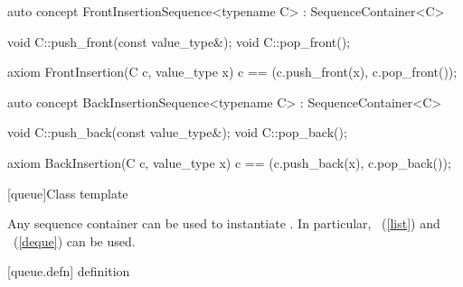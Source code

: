 \documentclass[american,twoside]{book}
\begin{document}
\begin{itemdecl}
auto concept FrontInsertionSequence<typename C> : SequenceContainer<C> {
  void C::push_front(const value_type&);
  void C::pop_front();

  axiom FrontInsertion(C c, value_type x) {
    c == (c.push_front(x), c.pop_front());
  }
}
\end{itemdecl}

\begin{itemdescr}
\pnum
{}
\end{itemdescr}

\begin{itemdecl}
auto concept BackInsertionSequence<typename C> : SequenceContainer<C> {
  void C::push_back(const value_type&);
  void C::pop_back();

  axiom BackInsertion(C c, value_type x) {
    c == (c.push_back(x), c.pop_back());
  }
}
\end{itemdecl}

\begin{itemdescr}
\pnum
{}
\end{itemdescr}

\color{black}

[queue]{Class template }

\pnum
{}%
Any sequence container 
can be used to instantiate
.
In particular,
\
(\ref{list})
and
\
(\ref{deque})
can be used.

[queue.defn]{ definition}
\end{document}

